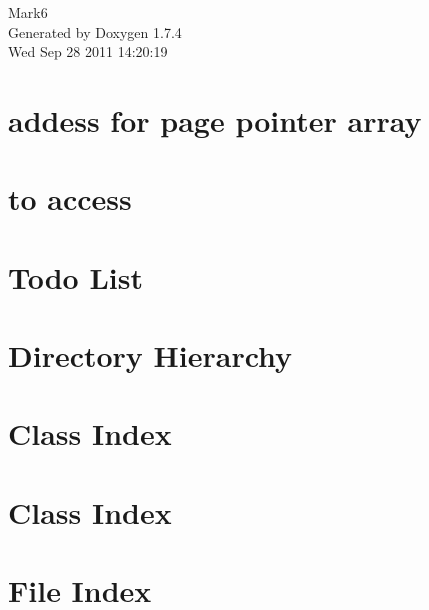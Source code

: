 \documentclass[a4paper]{book}
\begin{document}
\hypersetup{pageanchor=false}
\begin{titlepage}
\vspace*{7cm}
\begin{center}
{\Large Mark6 }\\
\vspace*{1cm}
{\large Generated by Doxygen 1.7.4}\\
\vspace*{0.5cm}
{\small Wed Sep 28 2011 14:20:19}\\
\end{center}
\end{titlepage}
\clearemptydoublepage
{}
\tableofcontents
\clearemptydoublepage
{}
\hypersetup{pageanchor=true}
\chapter{addess for page pointer array}
\label{base}
\hypertarget{base}{}

\chapter{to access}
\label{page}
\hypertarget{page}{}

\chapter{Todo List}
\label{todo}
\hypertarget{todo}{}

\chapter{Directory Hierarchy}

\chapter{Class Index}

\chapter{Class Index}

\chapter{File Index}

\end{document}
